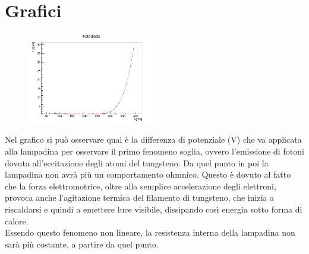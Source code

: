 \documentclass[10pt,twocolumn]{article}
\begin{document}


\section{Grafici}
\begin{figure}[H] %
  \centering
  \includegraphics[width=0.5\textwidth]{curva_voltammetrica/fotodiodo.png} %
  \label{fig:I/V_fotodiodo}
\end{figure}
Nel grafico si può osservare qual è la differenza di potenziale (V) che va applicata alla lampadina per osservare il primo fenomeno soglia, ovvero l'emissione di fotoni dovuta all'eccitazione degli atomi del tungsteno.
Da quel punto in poi la lampadina non avrà più un comportamento ohmnico. Questo è dovuto al fatto che la forza elettromotrice, oltre alla semplice accelerazione degli elettroni, provoca anche l'agitazione termica del filamento di tungsteno, che inizia a riscaldarsi e quindi a emettere luce visibile, dissipando così energia sotto forma di calore. \\
Essendo questo fenomeno non lineare, la resistenza interna della lampadina non sarà più costante, a partire da quel punto. 
\end{document}
